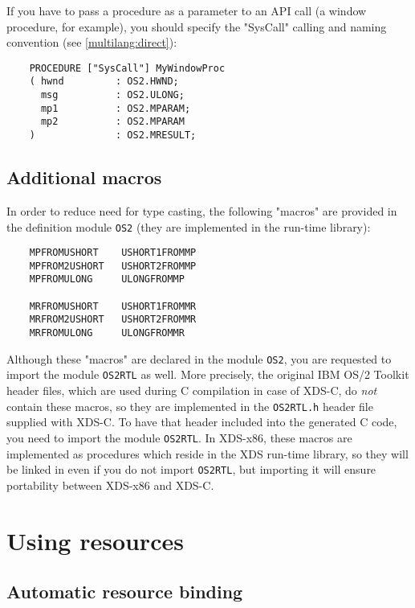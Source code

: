 If you have to pass a procedure as a parameter to an API call (a window
procedure, for example), you should specify the "SysCall" calling
and naming convention (see \ref{multilang:direct}):

\begin{verbatim}
    PROCEDURE ["SysCall"] MyWindowProc
    ( hwnd         : OS2.HWND;
      msg          : OS2.ULONG;
      mp1          : OS2.MPARAM;
      mp2          : OS2.MPARAM
    )              : OS2.MRESULT;
\end{verbatim}

\subsection{Additional macros}

In order to reduce need for type casting, the following "macros" are
provided in the definition module \verb'OS2'
(they are implemented in the run-time library):

\begin{verbatim}
    MPFROMUSHORT    USHORT1FROMMP
    MPFROM2USHORT   USHORT2FROMMP
    MPFROMULONG     ULONGFROMMP

    MRFROMUSHORT    USHORT1FROMMR
    MRFROM2USHORT   USHORT2FROMMR
    MRFROMULONG     ULONGFROMMR
\end{verbatim}

Although these "macros" are declared in the module \verb'OS2', you are
requested to import the module \verb'OS2RTL' as well. More precisely,
the original IBM OS/2 Toolkit header files, which are used during C compilation
in case of XDS-C, do {\em not} contain these macros, so they are implemented in
the \verb'OS2RTL.h' header file supplied with XDS-C.
To have that header included into the generated C code, you need to
import the module \verb'OS2RTL'.
In XDS-x86, these macros are implemented as procedures which reside
in the XDS run-time library, so they will be linked in even if you do not
import \verb'OS2RTL', but importing it will ensure portability between
XDS-x86 and XDS-C.

\section{Using resources}

\subsection{Automatic resource binding}

